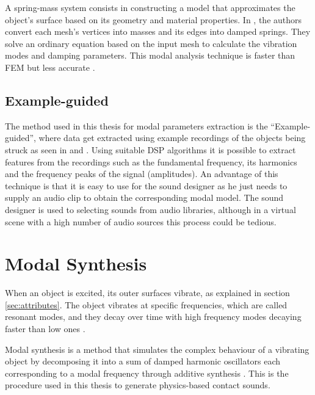 A spring-mass system consists in constructing a model that approximates the object's surface based on its geometry and material properties. In \cite{raghuvanshi2006interactive}, the authors convert each mesh's vertices into masses and its edges into damped springs. They solve an ordinary equation based on the input mesh to calculate the vibration modes and damping parameters. This modal analysis technique is faster than \gls{FEM} but less accurate \cite{ren2010synthesizing}.

\subsection{Example-guided}\label{sec:exampleguided}

The method used in this thesis for modal parameters extraction is the ``Example-guided'', where data get extracted using example recordings of the objects being struck as seen in \cite{lloyd2011sound} and \cite{ren2013example}. Using suitable \gls{DSP} algorithms it is possible to extract features from the recordings such as the fundamental frequency, its harmonics and the frequency peaks of the signal (amplitudes). An advantage of this technique is that it is easy to use for the sound designer as he just needs to supply an audio clip to obtain the corresponding modal model. The sound designer is used to selecting sounds from audio libraries, although in a virtual scene with a high number of audio sources this process could be tedious.

 
\section{Modal Synthesis}\label{sec:modal_synth}


When an object is excited, its outer surfaces vibrate, as explained in section \ref{sec:attributes}. The object vibrates at specific frequencies, which are called resonant modes, and they decay over time with high frequency modes decaying faster than low ones \cite{lloyd2011sound}. 

Modal synthesis is a method that simulates the complex behaviour of a vibrating object by decomposing it into a sum of damped harmonic oscillators each corresponding to a modal frequency through additive synthesis \cite{bilbao2009numerical}. This is the procedure used in this thesis to generate physics-based contact sounds.

